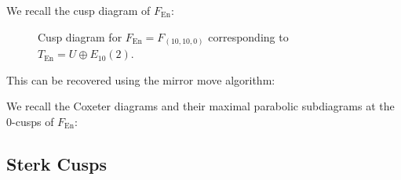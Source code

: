 \documentclass{amsart}
\begin{document}
\begin{remark}

We recall the cusp diagram of \(F_{\operatorname{En}}\):

\begin{figure}[H]
\centering

\caption{Cusp diagram for $F_{\operatorname{En}} = F_{(10, 10, 0)}$ corresponding to $T_{\operatorname{En}} = U \oplus E_{10}(2)$.}
\label{fig:enriques-cusp-diagram}
\end{figure}

This can be recovered using the mirror move algorithm:

\begin{figure}[H]
\centering

\caption{}
\label{fig:mirror-moves-enriques-simplified}
\end{figure}

\end{remark}

\begin{remark}

We recall the Coxeter diagrams and their maximal parabolic subdiagrams at the 0-cusps of \(F_{\operatorname{En}}\):

\begin{figure}[H]
\centering
\caption{}

\label{fig:enriques-maximal-parabolics-10-10-0}
\end{figure}

\end{remark}

\subsection{Sterk Cusps}\label{sterk-cusps}
\end{document}
